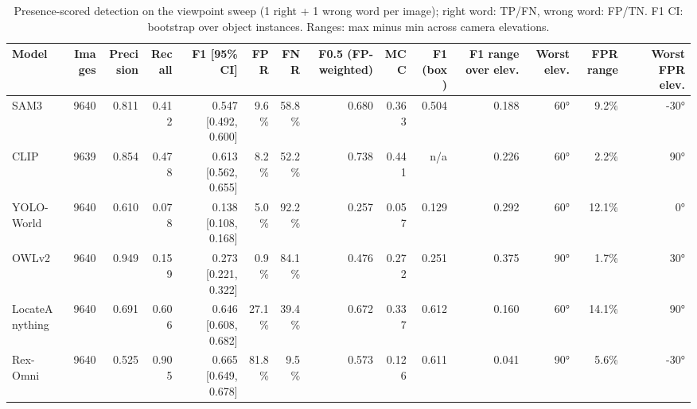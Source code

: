 \begin{table}[t]
\centering
\small
\begin{tabular}{lrrrrrrrrrrrrr}
\toprule
Model & Images & Precision & Recall & F1 [95\% CI] & FPR & FNR & F0.5 (FP-weighted) & MCC & F1 (box) & F1 range over elev. & Worst elev. & FPR range & Worst FPR elev. \\
\midrule
SAM3 & 9640 & 0.811 & 0.412 & 0.547 [0.492, 0.600] & 9.6\% & 58.8\% & 0.680 & 0.363 & 0.504 & 0.188 & 60° & 9.2\% & -30° \\
CLIP & 9639 & 0.854 & 0.478 & 0.613 [0.562, 0.655] & 8.2\% & 52.2\% & 0.738 & 0.441 & n/a & 0.226 & 60° & 2.2\% & 90° \\
YOLO-World & 9640 & 0.610 & 0.078 & 0.138 [0.108, 0.168] & 5.0\% & 92.2\% & 0.257 & 0.057 & 0.129 & 0.292 & 60° & 12.1\% & 0° \\
OWLv2 & 9640 & 0.949 & 0.159 & 0.273 [0.221, 0.322] & 0.9\% & 84.1\% & 0.476 & 0.272 & 0.251 & 0.375 & 90° & 1.7\% & 30° \\
LocateAnything & 9640 & 0.691 & 0.606 & 0.646 [0.608, 0.682] & 27.1\% & 39.4\% & 0.672 & 0.337 & 0.612 & 0.160 & 60° & 14.1\% & 90° \\
Rex-Omni & 9640 & 0.525 & 0.905 & 0.665 [0.649, 0.678] & 81.8\% & 9.5\% & 0.573 & 0.126 & 0.611 & 0.041 & 90° & 5.6\% & -30° \\
\bottomrule
\end{tabular}
\caption{Presence-scored detection on the viewpoint sweep (1 right + 1 wrong word per image); right word: TP/FN, wrong word: FP/TN. F1 CI: bootstrap over object instances. Ranges: max minus min across camera elevations.}
\end{table}
